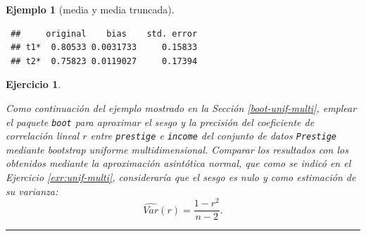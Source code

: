 \documentclass[
  10pt,
]{book}
\newenvironment{Shaded}{\begin{snugshade}}{\end{snugshade}}
\newcommand{\AttributeTok}[1]{\textcolor[rgb]{0.77,0.63,0.00}{#1}}
\newcommand{\ConstantTok}[1]{\textcolor[rgb]{0.00,0.00,0.00}{#1}}
\newcommand{\DecValTok}[1]{\textcolor[rgb]{0.00,0.00,0.81}{#1}}
\newcommand{\FunctionTok}[1]{\textcolor[rgb]{0.00,0.00,0.00}{#1}}
\newcommand{\NormalTok}[1]{#1}
\newcommand{\OtherTok}[1]{\textcolor[rgb]{0.56,0.35,0.01}{#1}}
\newcommand{\SpecialCharTok}[1]{\textcolor[rgb]{0.00,0.00,0.00}{#1}}
\newcommand{\StringTok}[1]{\textcolor[rgb]{0.31,0.60,0.02}{#1}}
\theoremstyle{break}
\newtheorem{exercise}{Ejercicio}[chapter]
\newtheorem{example}{Ejemplo}[chapter]
\theoremstyle{nonumberplain}
\begin{document}
\begin{example}[media y media truncada]
\begin{Shaded}
\end{Shaded}

\begin{verbatim}
 ##     original    bias    std. error
 ## t1*  0.80533 0.0031733     0.15833
 ## t2*  0.75823 0.0119027     0.17394
\end{verbatim}

\end{example}

\begin{exercise}
\protect\hypertarget{exr:unif-multi-sesgo-var}{}\label{exr:unif-multi-sesgo-var}

Como continuación del ejemplo mostrado en la Sección \ref{boot-unif-multi}, emplear el paquete \texttt{boot} para aproximar el sesgo y la precisión del coeficiente de correlación lineal \(r\) entre \texttt{prestige} e \texttt{income} del conjunto de datos \texttt{Prestige} mediante bootstrap uniforme multidimensional.
Comparar los resultados con los obtenidos mediante la aproximación asintótica normal, que como se indicó en el Ejercicio \ref{exr:unif-multi}, consideraría que el sesgo es nulo y como estimación de su varianza:
\[\widehat{Var}(r) = \frac{1 - r^2}{n - 2}.\]
\end{exercise}

\begin{center}\rule{0.5\linewidth}{0.5pt}\end{center}
\end{document}
